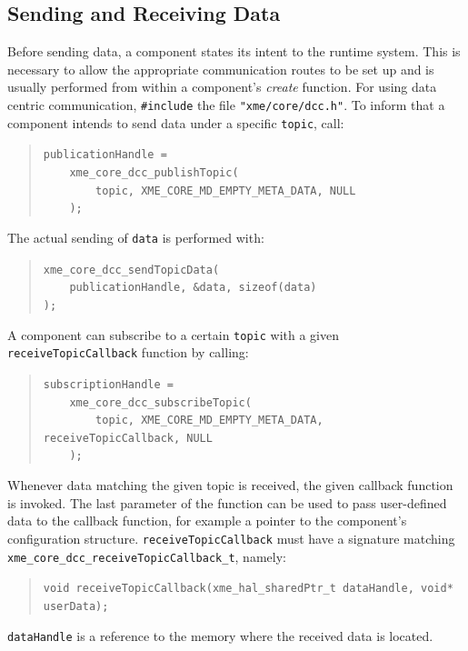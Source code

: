 \subsection{Sending and Receiving Data}

Before sending data, a component states its intent to the runtime system.
This is necessary to allow the appropriate communication routes to be set up
and is usually performed from within a component's \emph{create} function.
%
For using data centric communication, \verb|#include| the file \verb|"xme/core/dcc.h"|.
%
To inform \xme that a component intends to send data under a specific \verb|topic|, call:
\begin{quote}
	\verb|publicationHandle =|\\
	\verb|    xme_core_dcc_publishTopic(|\\
	\verb|        topic, XME_CORE_MD_EMPTY_META_DATA, NULL|\\
	\verb|    );|
\end{quote}

The actual sending of \verb|data| is performed with:
\begin{quote}
	\verb|xme_core_dcc_sendTopicData(|\\
	\verb|    publicationHandle, &data, sizeof(data)|\\
	\verb|);|
\end{quote}

A component can subscribe to a certain \verb|topic| with a given \verb|receiveTopicCallback| function by calling:
\begin{quote}
	\verb|subscriptionHandle =|\\
	\verb|    xme_core_dcc_subscribeTopic(|\\
	\verb|        topic, XME_CORE_MD_EMPTY_META_DATA, receiveTopicCallback, NULL|\\
	\verb|    );|
\end{quote}
Whenever data matching the given topic is received, the given callback function is invoked.
The last parameter of the function can be used to pass user-defined data to the callback function,
for example a pointer to the component's configuration structure.
%
\verb|receiveTopicCallback| must have a signature matching \verb|xme_core_dcc_receiveTopicCallback_t|, namely:
\begin{quote}
	\verb|void receiveTopicCallback(xme_hal_sharedPtr_t dataHandle, void* userData);|
\end{quote}
\verb|dataHandle| is a reference to the memory where the received data is located.

